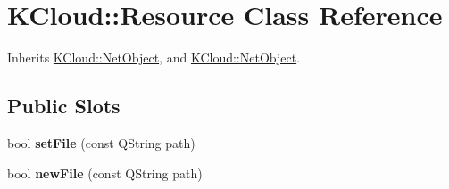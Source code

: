\hypertarget{class_k_cloud_1_1_resource}{\section{K\-Cloud\-:\-:Resource Class Reference}
\label{class_k_cloud_1_1_resource}
}


Inherits \hyperlink{class_k_cloud_1_1_net_object}{K\-Cloud\-::\-Net\-Object}, and \hyperlink{class_k_cloud_1_1_net_object}{K\-Cloud\-::\-Net\-Object}.

\subsection*{Public Slots}
\begin{DoxyCompactItemize}
\item 
\hypertarget{class_k_cloud_1_1_resource_aadf430844e65d48fa77100c7d4d1089c}{bool {\bfseries set\-File} (const Q\-String path)}\label{class_k_cloud_1_1_resource_aadf430844e65d48fa77100c7d4d1089c}

\item 
\hypertarget{class_k_cloud_1_1_resource_a808d81721200cee87d99ada42ee4998d}{bool {\bfseries new\-File} (const Q\-String path)}\label{class_k_cloud_1_1_resource_a808d81721200cee87d99ada42ee4998d}

\end{DoxyCompactItemize}
